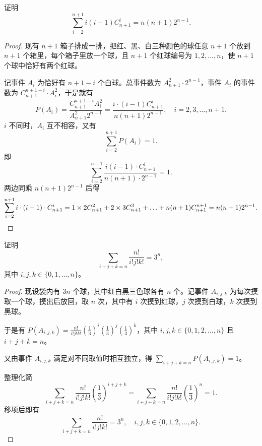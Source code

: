 
\begin{example}
  证明 \[\sum_{i=2}^{n+1} i(i-1)C_{n+1}^i = n(n+1)2^{n-1}. \]
\end{example}

\begin{proof}
现有 \(n + 1\) 箱子排成一排，把红、黑、白三种颜色的球任意 \(n + 1\) 个放到 \(n + 1\) 个箱里，每个箱子里放一个球，且 \(n + 1\) 个红球编号为 \(1,2,\ldots,n\)，使 \(n + 1\) 个球中恰好有两个红球。

记事件 \(A_i\) 为恰好有 \(n + 1 - i\) 个白球。总事件数为 \(A_{n + 1}^{2} \cdot 2^{n - 1}\)，事件 \(A_i\) 的事件数为 \(C_{n + 1}^{n + 1 - i} \cdot A_{i}^{2}\)，于是就有
\[
P(A_i) = \frac{C_{n + 1}^{n + 1 - i} A_{i}^{2}}{A_{n + 1}^{2} 2^{n - 1}} = \frac{i \cdot (i - 1) C_{n + 1}^{i}}{n(n + 1) 2^{n - 1}}, \quad i = 2,3,\ldots,n + 1. 
\]
\(i\) 不同时，\(A_i\) 互不相容，又有
\[
\sum_{i = 2}^{n + 1} P(A_i) = 1. 
\]
即
\[
\sum_{i = 2}^{n + 1} \frac{i(i - 1) \cdot C_{n + 1}^{i}}{n(n + 1) \cdot 2^{n - 1}} = 1. 
\]
两边同乘 \(n(n + 1) 2^{n - 1}\) 后得
\[
\sum_{i = 2}^{n + 1} i \cdot (i - 1) \cdot C_{n + 1}^{i} = 1 \times 2 C_{n + 1}^{2} + 2 \times 3 C_{n + 1}^{3} + \ldots + n(n + 1) C_{n + 1}^{n + 1} = n(n + 1) 2^{n - 1}. \qedhere
\]
\end{proof}

\begin{example}
  证明 \[\sum_{i+j+k=n} \frac{n!}{i!j!k!} = 3^n,\]其中 \(i,j,k \in \{0,1,\ldots,n\}\)。
\end{example}

\begin{proof}
现设袋内有 \(3n\) 个球，其中红白黑三色球各有 \(n\) 个。记事件 \(A_{i,j,k}\) 为每次摸取一个球，摸出后放回，取 \(n\) 次，其中有 \(i\) 次摸到红球，\(j\) 次摸到白球，\(k\) 次摸到黑球。

于是有 \(P(A_{i,j,k}) = \frac{n!}{i! j! k!} \left( \frac{1}{3} \right)^i \left( \frac{1}{3} \right)^j \left( \frac{1}{3} \right)^k\)，其中 \(i,j,k \in \{0,1,2,\ldots,n\}\) 且 \(i + j + k = n\)。

又由事件 \(A_{i,j,k}\) 满足对不同取值时相互独立，得 \(\sum_{i + j + k = n} P(A_{i,j,k}) = 1\)。

整理化简
\[
\sum_{i + j + k = n} \frac{n!}{i! j! k!} \left( \frac{1}{3} \right)^{i + j + k} = \sum_{i + j + k = n} \frac{n!}{i! j! k!} \left( \frac{1}{3} \right)^n = 1. 
\]
移项后即有
\[
\sum_{i + j + k = n} \frac{n!}{i! j! k!} = 3^n, \quad i,j,k \in \{0,1,2,\ldots,n\}. 
\]
\end{proof}

